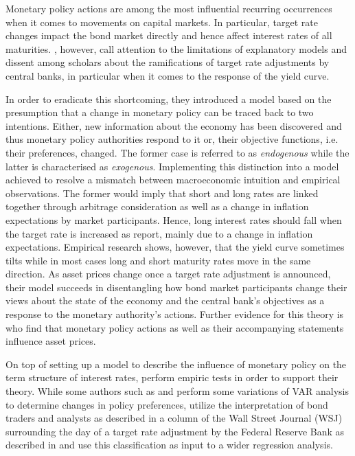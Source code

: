 
Monetary policy actions are among the most influential recurring occurrences when it comes to movements on capital markets. In particular, target rate changes impact the bond market directly and hence affect interest rates of all maturities. \textcite{Ellingsen.2001}, however, call attention to the limitations of explanatory models and dissent among scholars about the ramifications of target rate adjustments by central banks, in particular when it comes to the response of the yield curve. 

In order to eradicate this shortcoming, they introduced a model based on the presumption that a change in monetary policy can be traced back to two intentions. Either, new information about the economy has been discovered and thus monetary policy authorities respond to it or, their objective functions, i.e. their preferences, changed. The former case is referred to as \textit{endogenous} while the latter is characterised as \textit{exogenous}.
Implementing this distinction into a model achieved to resolve a mismatch between macroeconomic intuition and empirical observations. The former would imply that short and long rates are linked together through arbitrage consideration as well as a change in inflation expectations by market participants. Hence, long interest rates should fall when the target rate is increased as \textcite{Ellingsen.2003} report, mainly due to a change in inflation expectations. Empirical research shows, however, that the yield curve sometimes tilts while in most cases long and short maturity rates move in the same direction. As asset prices change once a target rate adjustment is announced, their model succeeds in disentangling how bond market participants change their views about the state of the economy and the central bank's objectives as a response to the monetary authority's actions. Further evidence for this theory is \textcite{Gurkaynak.2004} who find that monetary policy actions as well as their accompanying statements influence asset prices.

On top of setting up a model to describe the influence of monetary policy on the term structure of interest rates, \textcite{Ellingsen.2001} perform empiric tests in order to support their theory. While some authors such as \textcite{Peersman.2002} and \textcite{Evans.1998} perform some variations of VAR analysis to determine changes in policy preferences, \textcite{Ellingsen.2001} utilize the interpretation of bond traders and analysts as described in a column of the Wall Street Journal (WSJ) surrounding the day of a target rate adjustment by the Federal Reserve Bank as described in \textcite{Ellingsen.2003} and use this classification as input to a wider regression analysis.

